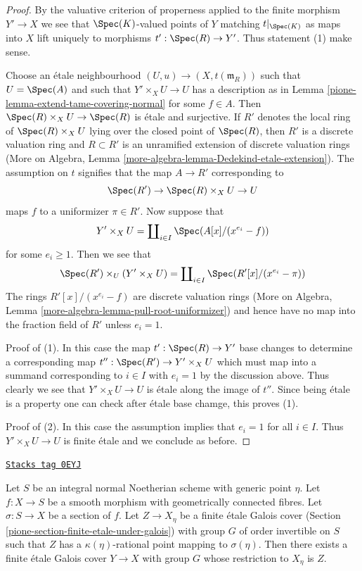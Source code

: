 \begin{proof}

By the valuative criterion of properness applied to
the finite morphism $Y' \to X$ we see that $\Spec(K)$-valued
points of $Y$ matching $t|_{\Spec(K)}$ as maps into $X$
lift uniquely to morphisms $t' : \Spec(R) \to Y'$.
Thus statement (1) make sense.

\medskip\noindent
Choose an \'etale neighbourhood $(U, u) \to (X, t(\mathfrak m_R))$
such that $U = \Spec(A)$ and such that $Y' \times_X U \to U$
has a description as in Lemma \ref{pione-lemma-extend-tame-covering-normal}
for some $f \in A$. Then $\Spec(R) \times_X U \to \Spec(R)$ is \'etale
and surjective. If $R'$ denotes the local ring of
$\Spec(R) \times_X U$ lying over the closed point of $\Spec(R)$,
then $R'$ is a discrete valuation ring and $R \subset R'$
is an unramified extension of discrete valuation rings
(More on Algebra, Lemma \ref{more-algebra-lemma-Dedekind-etale-extension}).
The assumption on $t$ signifies that the map $A \to R'$
corresponding to
$$
\Spec(R') \to \Spec(R) \times_X U \to U
$$
maps $f$ to a uniformizer $\pi \in R'$. Now suppose that
$$
Y' \times_X U =
\coprod\nolimits_{i \in I} \Spec(A[x]/(x^{e_i} - f))
$$
for some $e_i \geq 1$. Then we see that
$$
\Spec(R') \times_U (Y' \times_X U) =
\coprod\nolimits_{i \in I} \Spec(R'[x]/(x^{e_i} - \pi))
$$
The rings $R'[x]/(x^{e_i} - f)$ are discrete valuation rings
(More on Algebra, Lemma \ref{more-algebra-lemma-pull-root-uniformizer})
and hence have no map into the fraction field of $R'$ unless $e_i = 1$.

\medskip\noindent
Proof of (1). In this case the map $t' : \Spec(R) \to Y'$ base changes
to determine a corresponding map $t'' : \Spec(R') \to Y' \times_X U$
which must map into a summand corresponding to $i \in I$ with $e_i = 1$
by the discussion above. Thus clearly we see that $Y' \times_X U \to U$
is \'etale along the image of $t''$. Since being \'etale is a property
one can check after \'etale base chamge, this proves (1).

\medskip\noindent
Proof of (2). In this case the assumption implies that $e_i = 1$
for all $i \in I$. Thus $Y' \times_X U \to U$ is finite \'etale
and we conclude as before.
\end{proof}

\begin{lemma}
\label{pione-lemma-extend-covering}
\href{https://stacks.math.columbia.edu/tag/0EYJ}{\texttt{Stacks tag 0EYJ}}

Let $S$ be an integral normal Noetherian scheme with generic point $\eta$.
Let $f : X \to S$ be a smooth morphism with geometrically connected fibres.
Let $\sigma : S \to X$ be a section of $f$. Let $Z \to X_\eta$ be a
finite \'etale Galois cover (Section \ref{pione-section-finite-etale-under-galois})
with group $G$ of order invertible on $S$ such that
$Z$ has a $\kappa(\eta)$-rational point mapping to $\sigma(\eta)$.
Then there exists a finite \'etale Galois cover $Y \to X$ with group $G$
whose restriction to $X_\eta$ is $Z$.
\end{lemma}

